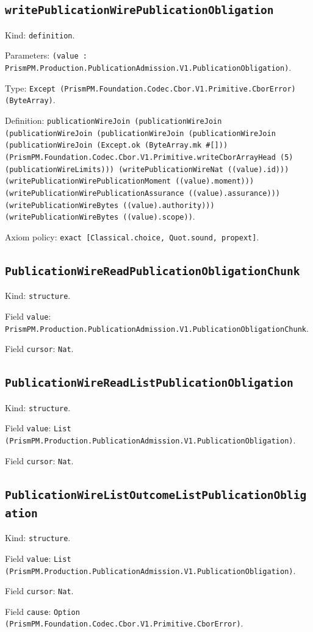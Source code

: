 \documentclass[11pt]{article}
\begin{document}
\subsection*{\texttt{writePublicationWirePublicationObligation}}
\noindent Kind: \texttt{definition}.\par
\noindent Parameters: \texttt{(value : PrismPM.Production.PublicationAdmission.V1.PublicationObligation)}.\par
\noindent Type: \texttt{Except (PrismPM.Foundation.Codec.Cbor.V1.Primitive.CborError) (ByteArray)}.\par
\noindent Definition: \texttt{publicationWireJoin (publicationWireJoin (publicationWireJoin (publicationWireJoin (publicationWireJoin (publicationWireJoin (Except.ok (ByteArray.mk \#[])) (PrismPM.Foundation.Codec.Cbor.V1.Primitive.writeCborArrayHead (5) (publicationWireLimits))) (writePublicationWireNat ((value).id))) (writePublicationWirePublicationMoment ((value).moment))) (writePublicationWirePublicationAssurance ((value).assurance))) (writePublicationWireBytes ((value).authority))) (writePublicationWireBytes ((value).scope))}.\par
\noindent Axiom policy: \texttt{exact [Classical.choice, Quot.sound, propext]}.\par
\subsection*{\texttt{PublicationWireReadPublicationObligationChunk}}
\noindent Kind: \texttt{structure}.\par
\noindent Field \texttt{value}: \texttt{PrismPM.Production.PublicationAdmission.V1.PublicationObligationChunk}.\par
\noindent Field \texttt{cursor}: \texttt{Nat}.\par
\subsection*{\texttt{PublicationWireReadListPublicationObligation}}
\noindent Kind: \texttt{structure}.\par
\noindent Field \texttt{value}: \texttt{List (PrismPM.Production.PublicationAdmission.V1.PublicationObligation)}.\par
\noindent Field \texttt{cursor}: \texttt{Nat}.\par
\subsection*{\texttt{PublicationWireListOutcomeListPublicationObligation}}
\noindent Kind: \texttt{structure}.\par
\noindent Field \texttt{value}: \texttt{List (PrismPM.Production.PublicationAdmission.V1.PublicationObligation)}.\par
\noindent Field \texttt{cursor}: \texttt{Nat}.\par
\noindent Field \texttt{cause}: \texttt{Option (PrismPM.Foundation.Codec.Cbor.V1.Primitive.CborError)}.\par
\end{document}
